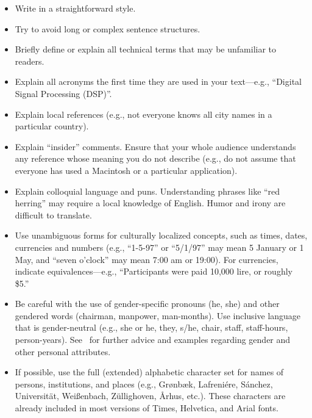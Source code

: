 \documentclass{sigchi}
\begin{document}
\begin{itemize}
\item Write in a straightforward style.
\item Try to avoid long or complex sentence structures.
\item Briefly define or explain all technical terms that may be
unfamiliar to readers.
\item Explain all acronyms the first time they are used in your text---e.g.,
``Digital Signal Processing (DSP)''.
\item Explain local references (e.g., not everyone knows all city
names in a particular country).
\item Explain ``insider'' comments. Ensure that your whole audience
understands any reference whose meaning you do not describe (e.g.,
do not assume that everyone has used a Macintosh or a particular
application).
\item Explain colloquial language and puns. Understanding phrases like
``red herring'' may require a local knowledge of English. Humor and
irony are difficult to translate.
\item Use unambiguous forms for culturally localized concepts, such as
times, dates, currencies and numbers (e.g., ``1-5-97'' or ``5/1/97''
may mean 5 January or 1 May, and ``seven o'clock'' may mean 7:00 am or
19:00). For currencies, indicate equivalences---e.g., ``Participants
were paid 10,000 lire, or roughly \$5.''
\item Be careful with the use of gender-specific pronouns (he, she)
and other gendered words (chairman, manpower, man-months). Use
inclusive language that is gender-neutral (e.g., she or he, they,
s/he, chair, staff, staff-hours,
person-years). See~\cite{Schwartz:1995:GBF} for further advice and
examples regarding gender and other personal attributes.
\item If possible, use the full (extended) alphabetic character set
for names of persons, institutions, and places (e.g.,
Gr{\o}nb{\ae}k, Lafreni\'ere, S\'anchez, Universit{\"a}t,
Wei{\ss}enbach, Z{\"u}llighoven, \r{A}rhus, etc.). These characters
are already included in most versions of Times, Helvetica, and Arial
fonts.
\end{itemize}
\end{document}
